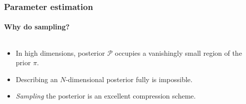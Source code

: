 \documentclass[%
]{beamer}
\newcommand{\posterior}{\mathcal{P}}
\newcommand{\prior}{\pi}
\begin{document}
%
% 
%
\begin{frame}
  \frametitle{Parameter estimation} 
  \framesubtitle{Why do sampling?} 

	\begin{columns}
	\begin{column}{0.5\textwidth}
		\begin{itemize}
          \item<4-> In high dimensions, posterior $\posterior$ occupies a vanishingly small region of the prior $\prior$.
          \item<5-> Describing an $N$-dimensional posterior fully is impossible.
          \item<6-> {\em Sampling\/} the posterior is an excellent compression scheme.
		\end{itemize}
	\end{column}
	\begin{column}{0.5\textwidth}

\end{column}
\end{columns}
\end{frame}
\end{document}
